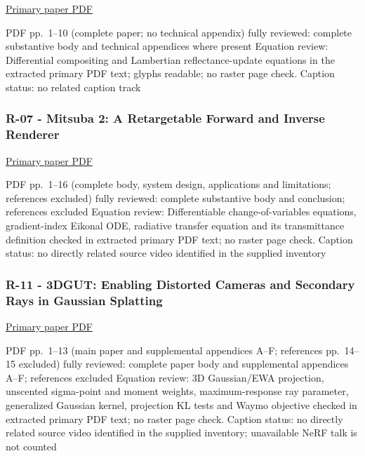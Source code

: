 \href{https://www.pauldebevec.com/Research/IBL/debevec-siggraph98.pdf}{Primary paper PDF}

PDF pp.~1--10 (complete paper; no technical appendix) fully reviewed: complete substantive body and technical appendices where present Equation review: Differential compositing and Lambertian reflectance-update equations in the extracted primary PDF text; glyphs readable; no raster page check. Caption status: no related caption track

\subsubsection{R-07 - Mitsuba 2: A Retargetable Forward and Inverse Renderer}\label{04-visual-computing-ii-ch036-r-07---mitsuba-2-a-retargetable-forward-and-inverse-renderer}

\href{https://rgl.s3.eu-central-1.amazonaws.com/media/papers/NimierDavidVicini2019Mitsuba2_7.pdf}{Primary paper PDF}

PDF pp.~1--16 (complete body, system design, applications and limitations; references excluded) fully reviewed: complete substantive body and conclusion; references excluded Equation review: Differentiable change-of-variables equations, gradient-index Eikonal ODE, radiative transfer equation and its transmittance definition checked in extracted primary PDF text; no raster page check. Caption status: no directly related source video identified in the supplied inventory

\subsubsection{R-11 - 3DGUT: Enabling Distorted Cameras and Secondary Rays in Gaussian Splatting}\label{04-visual-computing-ii-ch036-r-11---3dgut-enabling-distorted-cameras-and-secondary-rays-in-gaussian-splatting}

\href{https://research.nvidia.com/labs/toronto-ai/3DGUT/res/3DGUT_full_resolution.pdf}{Primary paper PDF}

PDF pp.~1--13 (main paper and supplemental appendices A--F; references pp.~14--15 excluded) fully reviewed: complete paper body and supplemental appendices A--F; references excluded Equation review: 3D Gaussian/EWA projection, unscented sigma-point and moment weights, maximum-response ray parameter, generalized Gaussian kernel, projection KL tests and Waymo objective checked in extracted primary PDF text; no raster page check. Caption status: no directly related source video identified in the supplied inventory; unavailable NeRF talk is not counted

